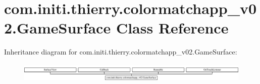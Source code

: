 \hypertarget{classcom_1_1initi_1_1thierry_1_1colormatchapp__v02_1_1_game_surface}{}\section{com.\+initi.\+thierry.\+colormatchapp\+\_\+v02.\+Game\+Surface Class Reference}
\label{classcom_1_1initi_1_1thierry_1_1colormatchapp__v02_1_1_game_surface}
Inheritance diagram for com.\+initi.\+thierry.\+colormatchapp\+\_\+v02.\+Game\+Surface\+:\begin{figure}[H]
\begin{center}
\leavevmode
\includegraphics[height=0.924092cm]{classcom_1_1initi_1_1thierry_1_1colormatchapp__v02_1_1_game_surface}
\end{center}
\end{figure}
